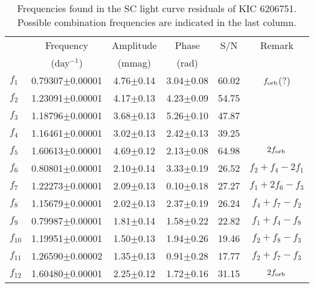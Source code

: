 \documentclass[useAMS,usenatbib,usegraphicx]{mn2e}
\begin{document}
\begin{table}
\caption{Frequencies found in the SC light curve residuals of KIC 6206751. Possible combination frequencies are indicated in the last column. }
\begin{tabular}{lccccc}
\hline
             & Frequency              & Amplitude           & Phase           & S/N            & Remark                     \\
             & (day$^{-1}$)           & (mmag)              & (rad)           &                &                            \\
\hline
$f_{1}$      & 0.79307$\pm$0.00001    & 4.76$\pm$0.14       & 3.04$\pm$0.08   & 60.02          & $f_{\rm orb}$(?)           \\
$f_{2}$      & 1.23091$\pm$0.00001    & 4.17$\pm$0.13       & 4.23$\pm$0.09   & 54.75          &                            \\
$f_{3}$      & 1.18796$\pm$0.00001    & 3.68$\pm$0.13       & 5.26$\pm$0.10   & 47.87          &                            \\
$f_{4}$      & 1.16461$\pm$0.00001    & 3.02$\pm$0.13       & 2.42$\pm$0.13   & 39.25          &                            \\
$f_{5}$      & 1.60613$\pm$0.00001    & 4.69$\pm$0.12       & 2.13$\pm$0.08   & 64.98          & $2f_{\rm orb}$             \\
$f_{6}$      & 0.80801$\pm$0.00001    & 2.10$\pm$0.14       & 3.33$\pm$0.19   & 26.52          & $f_2+f_4-2f_1$             \\
$f_{7}$      & 1.22273$\pm$0.00001    & 2.09$\pm$0.13       & 0.10$\pm$0.18   & 27.27          & $f_1+2f_6-f_3$             \\
$f_{8}$      & 1.15679$\pm$0.00001    & 2.02$\pm$0.13       & 2.37$\pm$0.19   & 26.24          & $f_4+f_7-f_2$              \\
$f_{9}$      & 0.79987$\pm$0.00001    & 1.81$\pm$0.14       & 1.58$\pm$0.22   & 22.82          & $f_1+f_4-f_8$              \\
$f_{10}$     & 1.19951$\pm$0.00001    & 1.50$\pm$0.13       & 1.94$\pm$0.26   & 19.46          & $f_2+f_8-f_3$              \\
$f_{11}$     & 1.26590$\pm$0.00002    & 1.35$\pm$0.13       & 0.91$\pm$0.28   & 17.77          & $f_2+f_7-f_3$              \\
$f_{12}$     & 1.60480$\pm$0.00001    & 2.25$\pm$0.12       & 1.72$\pm$0.16   & 31.15          & $2f_{\rm orb}$             \\

\end{tabular}
\end{table}
\end{document}
